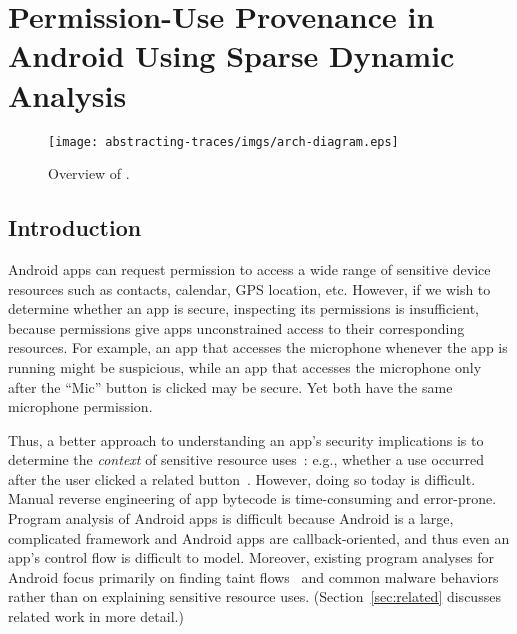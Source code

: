 \renewcommand{\thechapter}{5}

\chapter{Permission-Use Provenance in Android Using Sparse Dynamic Analysis}

\begin{figure*}[t]
  \texttt{[image: abstracting-traces/imgs/arch-diagram.eps]}
  \caption{Overview of \hogarth.}
  \label{fig:process}
\end{figure*}

\section{Introduction}
\label{sec:intro}

Android apps can request permission to access a wide range of
sensitive device resources such as contacts, calendar, GPS location,
etc. However, if we wish to determine whether an app is secure,
inspecting its permissions is insufficient, because permissions give
apps unconstrained access to their corresponding resources.  For
example, an app that accesses the microphone whenever the app is
running might be suspicious, while an app that accesses the microphone
only after the ``Mic'' button is clicked may be secure. Yet both have
the same microphone permission.

Thus, a better approach to understanding an app's security
implications is to determine the \emph{context} of sensitive resource
uses~\cite{WijesekeraBTREW17,olejnik2017,Nissenbaum:2004,Wijesekera:2015}: 
e.g., whether a use occurred after the user clicked
a related button~\cite{micinski2017}. However, doing so today is
difficult. Manual reverse engineering of app bytecode is
time-consuming and error-prone. Program analysis of Android apps is
difficult because Android is a large, complicated framework and
Android apps are callback-oriented, and thus even an app's control
flow is difficult to model.  Moreover, existing program
analyses for Android focus primarily on finding taint flows~\cite{Arzt2014,Enck2010,Yang2013,Bell2014,AppContext} and 
common malware
behaviors~\cite{Fratantonio2016,Yang2015,chen2013,wong2016intellidroid,Feng2014}
rather than on explaining sensitive resource uses. (Section~\ref{sec:related}
discusses related work in more detail.)

